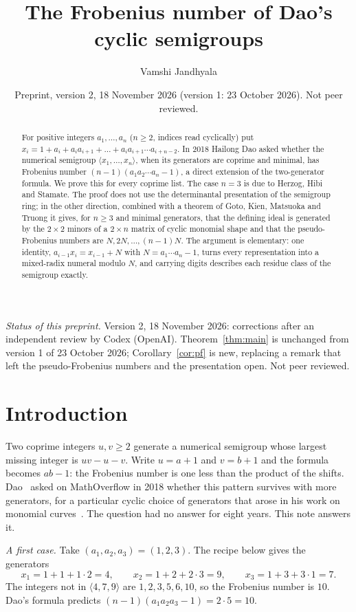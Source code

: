 \documentclass[11pt]{amsart}
\title[The Frobenius number of Dao's cyclic semigroups]{The Frobenius number of Dao's cyclic semigroups}
\author{Vamshi Jandhyala}
\date{Preprint, version 2, 18 November 2026 (version 1: 23 October 2026). Not peer reviewed.}
\theoremstyle{remark}
\begin{document}
\begin{abstract}
For positive integers $a_1,\dots,a_n$ ($n\ge2$, indices read cyclically) put $x_i=1+a_i+a_ia_{i+1}+\dots+a_ia_{i+1}\cdots a_{i+n-2}$. In 2018 Hailong Dao asked whether the numerical semigroup $\langle x_1,\dots,x_n\rangle$, when its generators are coprime and minimal, has Frobenius number $(n-1)(a_1a_2\cdots a_n-1)$, a direct extension of the two-generator formula. We prove this for every coprime list. The case $n=3$ is due to Herzog, Hibi and Stamate. The proof does not use the determinantal presentation of the semigroup ring; in the other direction, combined with a theorem of Goto, Kien, Matsuoka and Truong it gives, for $n\ge3$ and minimal generators, that the defining ideal is generated by the $2\times2$ minors of a $2\times n$ matrix of cyclic monomial shape and that the pseudo-Frobenius numbers are $N,2N,\dots,(n-1)N$. The argument is elementary: one identity, $a_{i-1}x_i=x_{i-1}+N$ with $N=a_1\cdots a_n-1$, turns every representation into a mixed-radix numeral modulo $N$, and carrying digits describes each residue class of the semigroup exactly.
\end{abstract}

\maketitle

\noindent\emph{Status of this preprint.} Version 2, 18 November 2026: corrections after an independent review by Codex (OpenAI). Theorem~\ref{thm:main} is unchanged from version 1 of 23 October 2026; Corollary~\ref{cor:pf} is new, replacing a remark that left the pseudo-Frobenius numbers and the presentation open. Not peer reviewed.

\section{Introduction}

Two coprime integers $u,v\ge2$ generate a numerical semigroup whose largest missing integer is $uv-u-v$. Write $u=a+1$ and $v=b+1$ and the formula becomes $ab-1$: the Frobenius number is one less than the product of the shifts. Dao~\cite{MO} asked on MathOverflow in 2018 whether this pattern survives with more generators, for a particular cyclic choice of generators that arose in his work on monomial curves~\cite{MO2}. The question had no answer for eight years. This note answers it.

\emph{A first case.} Take $(a_1,a_2,a_3)=(1,2,3)$. The recipe below gives the generators
\[
x_1=1+1+1\cdot2=4,\qquad x_2=1+2+2\cdot3=9,\qquad x_3=1+3+3\cdot1=7 .
\]
The integers not in $\langle4,7,9\rangle$ are $1,2,3,5,6,10$, so the Frobenius number is $10$. Dao's formula predicts $(n-1)(a_1a_2a_3-1)=2\cdot5=10$.
\end{document}
